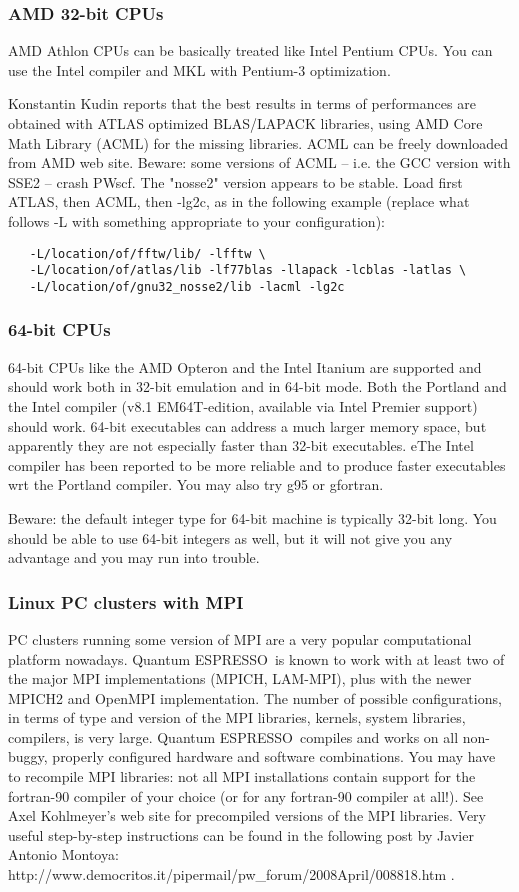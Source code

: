 \documentclass[12pt,a4paper]{article}
\def\qe{{\sc Quantum ESPRESSO}}
\begin{document}
\subsubsection{AMD 32-bit CPUs}
AMD Athlon CPUs can be basically treated like Intel Pentium CPUs. You
can use the Intel compiler and MKL with Pentium-3 optimization.

Konstantin Kudin reports that the best results in terms of performances
are obtained with ATLAS optimized BLAS/LAPACK libraries, using AMD
Core Math Library (ACML) for the missing libraries. ACML can be freely
downloaded from AMD web site. Beware: some versions of ACML -- i.e.
the GCC version with SSE2 -- crash PWscf. The "nosse2" version appears
to be stable. Load first ATLAS, then ACML, then -lg2c, as in the
following example (replace what follows -L with something appropriate
to your configuration):
  \begin{verbatim}
   -L/location/of/fftw/lib/ -lfftw \
   -L/location/of/atlas/lib -lf77blas -llapack -lcblas -latlas \
   -L/location/of/gnu32_nosse2/lib -lacml -lg2c
\end{verbatim}

\subsubsection{64-bit CPUs}
64-bit CPUs like the AMD Opteron and the Intel Itanium are supported and
should work both in 32-bit emulation and in 64-bit mode. Both the Portland
and the Intel compiler (v8.1 EM64T-edition, available via Intel
Premier support) should work. 64-bit executables can address a much
larger memory space, but apparently they are not especially faster
than 32-bit executables. 
eThe Intel compiler has been reported to be more reliable and to produce
faster executables wrt the Portland compiler. You may also try g95 or gfortran.

Beware: the default integer type for 64-bit machine is typically
32-bit long. You should be able to use 64-bit integers as well, 
but it will not give you any advantage and you may run into trouble.

\subsubsection{Linux PC clusters with MPI}
\label{Sec:LinuxPCMPI}
PC clusters running some version of MPI are a very popular
computational platform nowadays. \qe\ is known to work
with at least two of the major MPI implementations (MPICH, LAM-MPI),
plus with the newer MPICH2 and OpenMPI implementation. The number of
possible configurations, in terms of type and version of the MPI
libraries, kernels, system libraries, compilers, is very
large. \qe\ compiles and works on all non-buggy, properly
configured hardware and software combinations. You may have to
recompile MPI libraries: not all MPI installations contain support for
the fortran-90 compiler of your choice (or for any fortran-90 compiler
at all!).  See Axel Kohlmeyer's web site for precompiled versions of
the MPI libraries.  Very useful step-by-step instructions can be found
in the following post by  Javier Antonio Montoya:\\
http://www.democritos.it/pipermail/pw\_forum/2008April/008818.htm . 
\end{document}
